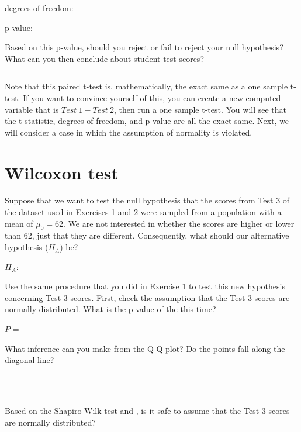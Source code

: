 \documentclass[
  openany]{krantz}
\begin{document}
degrees of freedom: \_\_\_\_\_\_\_\_\_\_\_\_\_\_\_\_\_\_

p-value: \_\_\_\_\_\_\_\_\_\_\_\_\_\_\_\_\_\_\_\_

Based on this p-value, should you reject or fail to reject your null hypothesis?
What can you then conclude about student test scores?

\begin{verbatim}
\end{verbatim}

Note that this paired t-test is, mathematically, the exact same as a one sample t-test.
If you want to convince yourself of this, you can create a new computed variable that is \(Test\:1 - Test\:2\), then run a one sample t-test.
You will see that the t-statistic, degrees of freedom, and p-value are all the exact same.
Next, we will consider a case in which the assumption of normality is violated.

\hypertarget{wilcoxon-test-1}{%
\section{Wilcoxon test}\label{wilcoxon-test-1}}

Suppose that we want to test the null hypothesis that the scores from Test 3 of the dataset used in Exercises 1 and 2 were sampled from a population with a mean of \(\mu_{0} = 62\).
We are not interested in whether the scores are higher or lower than 62, just that they are different.
Consequently, what should our alternative hypothesis (\(H_{A}\)) be?

\(H_{A}\): \_\_\_\_\_\_\_\_\_\_\_\_\_\_\_\_\_\_\_

Use the same procedure that you did in Exercise 1 to test this new hypothesis concerning Test 3 scores.
First, check the assumption that the Test 3 scores are normally distributed.
What is the p-value of the  this time?

\(P\) = \_\_\_\_\_\_\_\_\_\_\_\_\_\_\_\_\_\_\_\_

What inference can you make from the Q-Q plot?
Do the points fall along the diagonal line?

\begin{verbatim}



\end{verbatim}

Based on the Shapiro-Wilk test and , is it safe to assume that the Test 3 scores are normally distributed?
\end{document}
